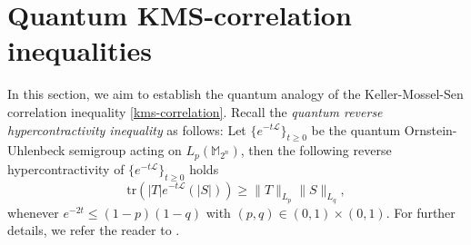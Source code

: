 \documentclass{amsbook}
\theoremstyle{definition}
\theoremstyle{remark}
\numberwithin{section}{chapter}
\numberwithin{equation}{chapter}
\newcommand{\M}{\mathbb{M}}
\newcommand{\1}{\mathbf{1}}
\newcommand{\s}{\mathbf{s}}
\newcommand{\La}{\mathcal{L}}
\begin{document}
\section{Quantum KMS-correlation inequalities}
In this section, we aim to establish the quantum analogy  of the Keller-Mossel-Sen correlation inequality \eqref{kms-correlation}.  Recall the \emph{quantum reverse hypercontractivity inequality} as follows: Let $\{e^{-t\La}\}_{t\geq 0}$ be the quantum Ornstein-Uhlenbeck semigroup acting on $L_{p}(\M_{2^{n}})$, then the following reverse hypercontractivity of $\{e^{-t\La}\}_{t\geq 0}$ holds
\begin{equation}\label{reverse-hyper}
	\mathrm{tr}\left(|T|e^{-t\La}(|S|)\right)\geq \|T\|_{L_{p}}\|S\|_{L_{q}},
\end{equation}
whenever $e^{-2t}\leq (1-p)(1-q)$ with $(p,q)\in (0,1)\times (0,1)$. For further details, we refer the reader to \cite{BDR2020,CKMT2015}.
\end{document}

